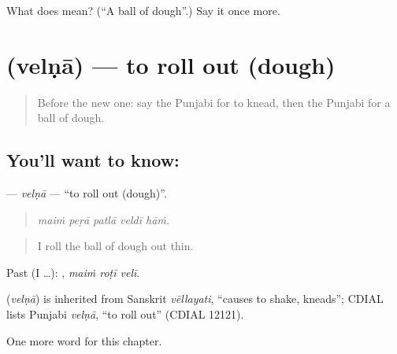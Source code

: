 \begin{tcolorbox}[breakable,colback=teal!4,colframe=teal!35!black,title={Before you move on}]
What does  mean? (\textquotedblleft{}A ball of dough\textquotedblright{}.) Say it once more.
\end{tcolorbox}
\section[\texorpdfstring{\pa{ਵੇਲਣਾ} (velṇā)}{ਵੇਲਣਾ (velṇā)}]{ (velṇā) — to roll out (dough)}

\label{lesson:PA-C238-velna}



\begin{quote}
Before the new one: say the Punjabi for to knead, then the Punjabi for a ball of dough.
\end{quote}

\subsection*{You'll want to know: }
\textbf{} — \emph{velṇā} — \textquotedblleft{}to roll out (dough)\textquotedblright{}.

\begin{quote}
    
\end{quote}

\begin{quote}
\emph{maiṁ peṛā patlā veldī hāṁ.}
\end{quote}

\begin{quote}
I roll the ball of dough out thin.
\end{quote}

Past (I …):   , \emph{maiṁ roṭī velī}.

\begin{cousinweb}
\textbf{} (\emph{velṇā}) is inherited from Sanskrit \emph{vēllayati}, \textquotedblleft{}causes to shake, kneads\textquotedblright{}; CDIAL lists Punjabi \emph{velṇā}, \textquotedblleft{}to roll out\textquotedblright{} (CDIAL 12121).
\end{cousinweb}

\begin{grammarlens}[title={What you've built}]
One more word for this chapter.
\end{grammarlens}

